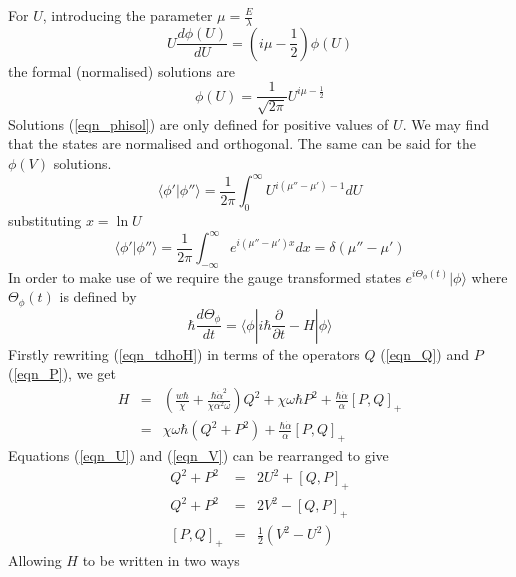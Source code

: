 \documentclass[11pt, a4paper, titlepage]{article}
\newcommand{\lb}{\left(}
\newcommand{\rb}{\right)}
\newcommand{\acb}[2]{\left[ #1 , #2 \right]_+}
\newcommand{\eqn}[1]{(\ref{#1})}
\begin{document}
For $U$, introducing the parameter $\mu=\frac{E}{\lambda}$
\begin{equation}
  \label{eqn_uvev}
    U \frac{d \phi(U)}{d U} = (i \mu - \frac{1}{2}) \phi(U)
\end{equation}
the formal (normalised) solutions are \cite{ref_uvvu}
\begin{equation}
  \label{eqn_phisol}
    \phi(U) = \frac{1}{\sqrt{2 \pi}} U^{i\mu - \frac{1}{2}}
\end{equation}
Solutions (\ref{eqn_phisol}) are only defined for positive values of
$U$. We may find that the states are normalised and orthogonal. The
same can be said for the $\phi(V)$ solutions. 
\begin{equation}
  \label{eqn_phino}
    \langle \phi' | \phi'' \rangle = \frac{1}{2\pi}\int^\infty_0 U^{i(\mu'' - \mu') - 1} d U
\end{equation}
substituting $x = \ln U$
\begin{equation}
  \label{eqn_phinox}
    \langle \phi' | \phi'' \rangle = \frac{1}{2\pi}\int^\infty_{-\infty} e^{i(\mu'' - \mu')x} dx = \delta(\mu''-\mu')
\end{equation}
In order to make use of \cite{ref_td} we require the gauge transformed
states $e^{i \Theta_\phi(t)} | \phi \rangle$ where $\Theta_\phi(t)$ is defined by
\begin{equation}
  \label{eqn_alpha}
    \hbar \frac{d \Theta_\phi}{d t} = \langle \phi|i\hbar \frac{\partial }{\partial t} - H|\phi \rangle
\end{equation}
Firstly rewriting (\ref{eqn_tdhoH}) in terms of the operators $Q$
(\ref{eqn_Q}) and $P$ (\ref{eqn_P}), we get 
\begin{eqnarray}
  \label{eqn_HQP1}
        H &=& \left(\frac{w\hbar}{\chi}+\frac{\hbar \dot{\alpha}^2}{\chi\alpha^2\omega}\right)Q^2
          + \chi\omega\hbar P^2
          + \frac{\hbar\dot{\alpha}}{\alpha}[P,Q]_+ \\
  \label{eqn_HQP2}
          &=& \chi\omega\hbar \left( Q^2+P^2\right) + \frac{\hbar\dot{\alpha}}{\alpha}[P,Q]_+
\end{eqnarray}
Equations \eqn{eqn_U} and \eqn{eqn_V} can be rearranged to give
\begin{eqnarray}
  \label{eqn_U2}
    Q^2 + P^2 &=& 2U^2 + \acb Q P \\
  \label{eqn_V2}
    Q^2 + P^2 &=& 2V^2 - \acb Q P \\
   \label{eqn_UVac}
    \acb P Q  &=& \frac{1}{2}\lb V^2 - U^2\rb
\end{eqnarray}
Allowing $H$ to be written in two ways
\end{document}
